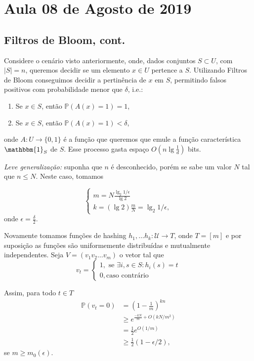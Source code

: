 \section{Aula 08 de Agosto de 2019}
\label{2019_08_08}

\subsection{Filtros de Bloom, cont.}
Considere o cenário visto anteriormente, onde, dados conjuntos $S\subset
U$, com $|S|=n$, queremos decidir se um elemento $x\in U$ pertence a $S$.
Utilizando Filtros de Bloom conseguimos decidir a pertinência de $x$ em
$S$, permitindo falsos positivos com probabilidade menor que $\delta$,
i.e.:
\begin{enumerate}
    \item Se $x\in S$, então $\mathbb{P}(A(x)=1)=1$,
    \item Se $x\in S$, então $\mathbb{P}(A(x)=1)< \delta$,
\end{enumerate}

onde $A:U \to \{0,1\}$ \'e a fun\c{c}\~ao que queremos que emule a
fun\c{c}\~ao caracter\'istica $\mathbbm{1}_S$ de $S$. 
Esse processo gasta
espa\c{c}o $O(n \lg{\frac{1}{d}})$ bits.

\textit{Leve generaliza\c{c}\~ao:} suponha que $n$ \'e desconhecido, por\'em se sabe um valor $N$ tal que $n \le N$. Neste caso, tomamos

\[\begin{cases}
m = N \frac{\lg_2{1/\epsilon}}{\lg 2}
\\k= (\lg 2)\frac{m}{N}= \lg_2{1/\epsilon},
\end{cases}
\]
onde  $\epsilon = \frac{\delta}{2}$.

Novamente tomamos fun\c{c}\~oes de hashing $h_1,\dots h_k: \mathcal{U}
\to T$, onde $T = [m]$ e por suposi\c{c}\~ao as fun\c{c}\~oes s\~ao
uniformemente distribu\'idas e mutualmente independentes. 
Seja 
$V=(v_1 v_2 \dots v_m)$ o vetor tal que 
\[v_t = \begin{cases}
1, \text{ se } \exists i, s\in S: h_i(s)=t
\\0, \text{caso contr\'ario}
\end{cases}\]

Assim, para todo $t\in T$
\begin{align*}
  \mathbb{P}(v_t=0)&= \left(1-\frac{1}{m}\right)^{kn}\\
                    &\ge e^{\frac{-kN}{m}+O(kN/m^2)}\\
                    &=\frac{1}{2}e^{O(1/m)}\\
                    &\ge \frac{1}{2}(1-\epsilon/2),
\end{align*}
se $m\ge m_0(\epsilon)$.

